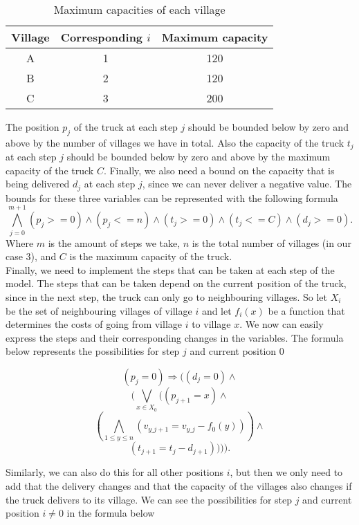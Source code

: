 \documentclass[a4paper]{article}
\begin{document}
\begin{table}[H]
\centering
\caption{Maximum capacities of each village}
\label{my-label}
\begin{tabular}{c|c|c}
\textbf{Village} & \textbf{Corresponding $i$} & \textbf{Maximum capacity} \\ \hline
A	&	1	&	120\\ \hline
B	&	2	&	120\\ \hline
C	&	3	&	200
\end{tabular}
\end{table}

	The position $p_j$ of the truck at each step $j$ should be bounded below by zero and above by the number of villages we have in total. Also the capacity of the truck $t_j$ at each step $j$ should be bounded below by zero and above by the maximum capacity of the truck $C$. Finally, we also need a bound on the capacity that is being delivered $d_j$ at each step $j$, since we can never deliver a negative value. The bounds for these three variables can be represented with the following formula
	\[ \bigwedge_{j=0}^{m+1} (p_j >= 0) \wedge (p_j <= n) \wedge (t_j >= 0) \wedge (t_j <= C) \wedge (d_j >= 0).\]
	Where $m$ is the amount of steps we take, $n$ is the total number of villages (in our case 3), and $C$ is the maximum capacity of the truck.\\

Finally, we need to implement the steps that can be taken at each step of the model. The steps that can be taken depend on the current position of the truck, since in the next step, the truck can only go to neighbouring villages. So let $X_i$ be the set of neighbouring villages of village $i$ and let $f_i(x)$ be a function that determines the costs of going from village $i$ to village $x$. We now can easily express the steps and their corresponding changes in the variables. The formula below represents the possibilities for step $j$ and current position $0$

\[ (p_j = 0) \Rightarrow ( (d_j = 0) \wedge \]
\[ (\bigvee_{x \in X_0} ((p_{j+1} = x) \wedge \]
\[ (\bigwedge_{1 \leq y \leq n} (v_{y\_j+1} = v_{y\_j} - f_0(y))) \wedge \]
\[ (t_{j+1} = t_j - d_{j+1})))).\]

Similarly, we can also do this for all other positions $i$, but then we only need to add that the delivery changes and that the capacity of the villages also changes if the truck delivers to its village. We can see the possibilities for step $j$ and current position $i \neq 0$ in the formula below
\end{document}
